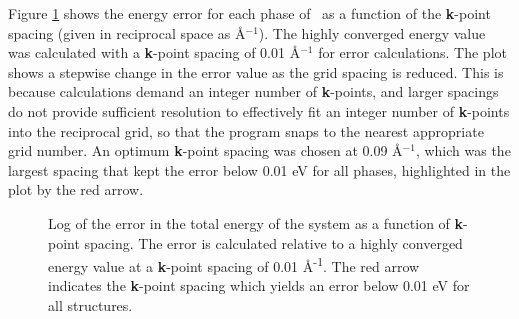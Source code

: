 Figure \ref{Figure:kpoint_convergence} shows the energy error for each phase of \zirconia\ as a function of the \textbf{k}-point spacing (given in reciprocal space as \r{A}$^{-1}$). The highly converged energy value was calculated with a \textbf{k}-point spacing of 0.01 \r{A}$^{-1}$ for error calculations. The plot shows a stepwise change in the error value as the grid spacing is reduced. This is because calculations demand an integer number of \textbf{k}-points, and larger spacings do not provide sufficient resolution to effectively fit an integer number of \textbf{k}-points into the reciprocal grid, so that the program snaps to the nearest appropriate grid number. An optimum \textbf{k}-point spacing was chosen at 0.09 \r{A}$^{-1}$, which was the largest spacing that kept the error below 0.01 eV for all phases, highlighted in the plot by the red arrow.

\begin{figure}[ht]
\begin{center}
		\caption{Log of the error in the total energy of the system as a function of \textbf{k}-point spacing. The error is calculated relative to a highly converged energy value at a \textbf{k}-point spacing of 0.01 \r{A}\textsuperscript{-1}. The red arrow indicates the \textbf{k}-point spacing which yields an error below 0.01 eV for all structures.}
		\label{Figure:kpoint_convergence}
	\end{center}
\end{figure}

